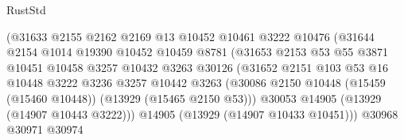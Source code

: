 \begin{lexlean}{RustStd}
\begin{coremodule}
                                      (@31633
                                        @2155
                                        @2162
                                        @2169
                                        @13
                                        @10452
                                        @10461
                                        @3222
                                        @10476
                                        (@31644
                                          @2154
                                          @1014
                                          @19390
                                          @10452
                                          @10459
                                          @8781
                                          (@31653
                                            @2153
                                            @53
                                            @55
                                            @3871
                                            @10451
                                            @10458
                                            @3257
                                            @10432
                                            @3263
                                            @30126
                                            (@31652
                                              @2151
                                              @103
                                              @53
                                              @16
                                              @10448
                                              @3222
                                              @3236
                                              @3257
                                              @10442
                                              @3263
                                              (@30086
                                                @2150
                                                @10448
                                                (@15459 (@15460 @10448))
                                                (@13929 (@15465 @2150 @53)))
                                              @30053
                                              @14905
                                              (@13929 (@14907 @10443 @3222)))
                                            @14905
                                            (@13929 (@14907 @10433 @10451)))
                                          @30968
                                          @30971
                                          @30974

\end{coremodule}
\end{lexlean}
